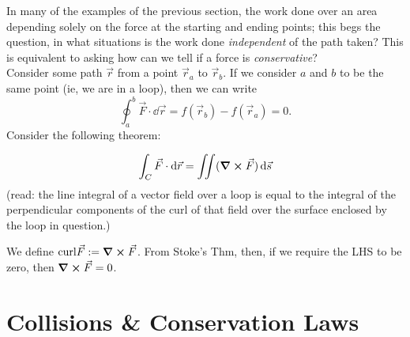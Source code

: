 \documentclass[12pt]{article}
\begin{document}
In many of the examples of the previous section, the work done over an area depending solely on the force at the starting and ending points; this begs the question, in what situations is the work done \textit{independent} of the path taken? This is equivalent to asking how can we tell if a force is \textit{conservative}?\\
Consider some path $\vec{r}$ from a point $\vec{r}_a$ to $\vec{r}_b$. If we consider $a$ and $b$ to be the same point (ie, we are in a loop), then we can write \[\oint_a^b \vec{F} \cdot \dd{\vec{r}} = f(\vec{r}_b) - f(\vec{r}_a) = 0.\] Consider the following theorem:
\begin{theorem}
  \[\int_C\vec{F}\cdot \dd{\vec{r}} = \iint (\curl \vec{F}) \dd{\vec{s}}\]
  (read: the line integral of a vector field over a loop is equal to the integral of the perpendicular components of the curl of that field over the surface enclosed by the loop in question.)
\end{theorem}

We define $\text{curl} \vec{F} :=\curl \vec{F}$. From Stoke's Thm, then, if we require the LHS to be zero, then $\curl \vec{F} = 0$.

\section{Collisions \& Conservation Laws}
\end{document}
